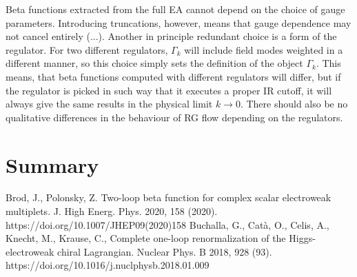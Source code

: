\documentclass[11pt, a4paper]{article}
\begin{document}
Beta functions extracted from the full EA cannot depend on the choice of gauge parameters.
Introducing truncations, however, means that gauge dependence may not cancel entirely (...).
Another in principle redundant choice is a form of the regulator. For two different regulators,
$\Gamma_k$ will include field modes weighted in a different manner, so this choice simply
sets the definition of the object $\Gamma_k$. 
This means, that beta functions computed with different regulators will differ, but
if the regulator is picked in such way that it executes a proper IR cutoff,
it will always give the same results in the physical limit $k \rightarrow 0$. There should also be no
qualitative differences in the behaviour of RG flow depending on the regulators.


\section*{Summary}

\begin{thebibliography}{9}
    Brod, J., Polonsky, Z. Two-loop beta function for complex scalar electroweak multiplets. J. High Energ. Phys. 2020, 158 (2020). https://doi.org/10.1007/JHEP09(2020)158
    Buchalla, G., Catà, O., Celis, A., Knecht, M., Krause, C., Complete one-loop renormalization of the Higgs-electroweak chiral Lagrangian. Nuclear Phys. B 2018, 928 (93). https://doi.org/10.1016/j.nuclphysb.2018.01.009
\end{thebibliography}
\end{document}
